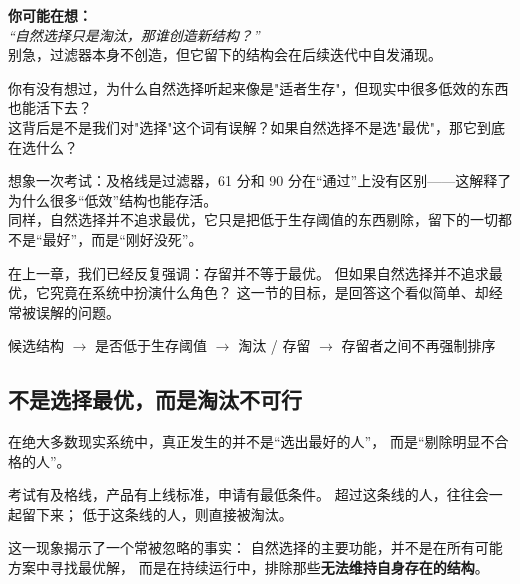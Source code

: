 \documentclass[openany, a4paper, 12pt]{book}
\newcommand{\lowfreq}[1]{\textbf{\textcolor{red!70!black}{#1}}}
\newenvironment{logicmap}{
	\begin{tcolorbox}[
		colback=blue!5!white,      %
		colframe=blue!50!black,    %
		title=\textbf{逻辑地图 (Logic Map)}, %
		fonttitle=\bfseries,
		sharp corners=south,       %
		boxrule=0.5mm
		]
	\centering
	}{
	\end{tcolorbox}
}
\newenvironment{motivation}{
	\vspace{0.5em}
	\begin{tcolorbox}[
		colback=gray!10,           %
		colframe=gray!60,          %
		title=\textit{本章动机 (Motivation)},
		fonttitle=\bfseries,
		arc=0mm,                   %
		leftrule=3mm               %
		]
		\small \itshape %
	}{
	\end{tcolorbox}
	\vspace{1em}
}
\begin{document}
\begin{tcolorbox}[colback=yellow!5, title=\textit{读者行为预测}]
	\textbf{你可能在想：}\\
	\textit{“自然选择只是淘汰，那谁创造新结构？”}\\
	别急，过滤器本身不创造，但它留下的结构会在后续迭代中自发涌现。
\end{tcolorbox}

\begin{readingnote}
	你有没有想过，为什么自然选择听起来像是"适者生存"，但现实中很多低效的东西也能活下去？\\
	这背后是不是我们对"选择"这个词有误解？如果自然选择不是选"最优"，那它到底在选什么？
\end{readingnote}

\begin{tcolorbox}[colback=green!5, title=\textit{生活类比}]
	想象一次考试：及格线是过滤器，61 分和 90 分在“通过”上没有区别——这解释了为什么很多“低效”结构也能存活。\\
	同样，自然选择并不追求最优，它只是把低于生存阈值的东西剔除，留下的一切都不是“最好”，而是“刚好没死”。
\end{tcolorbox}

\begin{motivation}
	在上一章，我们已经反复强调：存留并不等于最优。
	但如果自然选择并不追求最优，它究竟在系统中扮演什么角色？
	这一节的目标，是回答这个看似简单、却经常被误解的问题。
\end{motivation}

\begin{logicmap}
	候选结构
	$\rightarrow$ 是否低于生存阈值
	$\rightarrow$ 淘汰 / 存留
	$\rightarrow$ 存留者之间不再强制排序
\end{logicmap}

\subsection{不是选择最优，而是淘汰不可行}

\begin{readingnote}
	在绝大多数现实系统中，真正发生的并不是“选出最好的人”，
	而是“剔除明显不合格的人”。
	
	考试有及格线，产品有上线标准，申请有最低条件。
	超过这条线的人，往往会一起留下来；
	低于这条线的人，则直接被淘汰。
\end{readingnote}

这一现象揭示了一个常被忽略的事实：
自然选择的主要功能，并不是在所有可能方案中寻找最优解，
而是在持续运行中，排除那些\lowfreq{无法维持自身存在的结构}。
\end{document}
